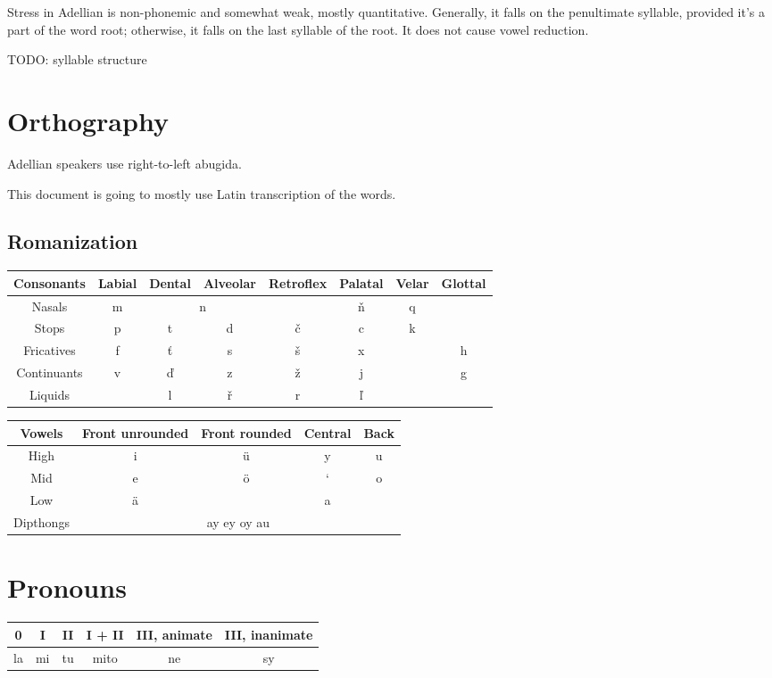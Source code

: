 \documentclass[12pt]{article}
\begin{document}
	Stress in Adellian is non-phonemic and somewhat weak, mostly quantitative. Generally, it falls on the penultimate syllable, provided it's a part of the word root; otherwise, it falls on the last syllable of the root. It does not cause vowel reduction.

	TODO: syllable structure

	\section{Orthography}
	
	Adellian speakers use right-to-left abugida.

	This document is going to mostly use Latin transcription of the words.
	
	\subsection{Romanization} 

	\begin{tabular}{||c | c c c c c c c||}
		\hline
		Consonants & Labial & Dental & Alveolar &
		Retroflex & Palatal & Velar & Glottal \\
		\hline
		Nasals & m & \multicolumn{2}{c}{n} & & ň & q & \\
		Stops & p & t & d & č & c & k & \\
		Fricatives & f & ť & s & š & x & & h \\
		Continuants & v & ď & z & ž & j & & g \\	
		Liquids & & l & ř & r & ľ & & \\
		\hline
	\end{tabular}

	\begin{tabular}{|| c | c c c c || }
		\hline
	Vowels & Front unrounded & Front rounded & Central & Back \\
	\hline
	High & i & ü & y & u \\
	Mid & e & ö & ` & o \\
	Low & ä & & a & \\
	Dipthongs & \multicolumn{4}{c||}{ay ey oy au} \\
	\hline
	\end{tabular}

	\section{Pronouns}

	\begin{tabular}{|| c | c | c | c | c | c ||}
		\hline
		0 & I & II & I + II & III, animate & III, inanimate\\
		\hline
		la & mi & tu & mito & ne & sy\\
		\hline
	\end{tabular}
\end{document}
